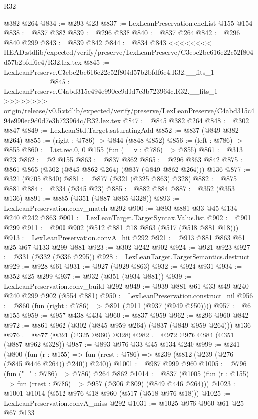 \begin{lexlean}{R32}
\begin{coremodule}
{{{{{{{{{{{{    @382
    @264
@834 := @293 @23
@837 := LexLeanPreservation.encList @155 @154
@838 := @837 @382
@839 := @296 @838
@840 := @837 @264
@842 := @296 @840 @299
@843 := @839 @842
@844 := @834 @843
<<<<<<<< HEAD:stdlib/expected/verify/preserve/LexLeanPreserve/C3ebc2be616e22c52f804d57b2bfdf6e4/R32.lex.tex
@845 := LexLeanPreserve.C3ebc2be616e22c52f804d57b2bfdf6e4.R32.__fits_1
========
@845 := LexLeanPreserve.C4abd315c494e990ec9d0d7e3b723964c.R32.__fits_1
>>>>>>>> origin/release/v0.5:stdlib/expected/verify/preserve/LexLeanPreserve/C4abd315c494e990ec9d0d7e3b723964c/R32.lex.tex
@847 := @845 @382 @264
@848 := @302 @847
@849 := LexLeanStd.Target.saturatingAdd
@852 := @837 (@849 @382 @264)
@855 := (right : @786) -> @844 (@848 @852)
@856 := (left : @786) -> @855
@860 := List.rec.{0, 0} @155 (fun (__v : @786) => @855)
@861 := @313 @23
@862 := @2 @155
@863 := @837 @862
@865 := @296 @863 @842
@875 := @861 @865 (@302 (@845 @862 @264) (@837 (@849 @862 @264))) @136
@877 := @321 (@705 @840)
@881 := @877 (@321 (@325 @863) @328)
@882 := @875 @881
@884 := @334 (@345 @23)
@885 := @882 @884
@887 := @352 (@353 @136)
@891 := @885 (@351 (@887 @865 @328))
@893 := LexLeanPreservation.conv_match @292
@900 := @893 @881 @33 @45 @134 @240 @242 @863
@901 := LexLeanTarget.TargetSyntax.Value.list
@902 := @901 @299
@911 := @900 @902 (@512 @881 @18 @863 (@517 (@518 @881 @18)))
@913 := LexLeanPreservation.convA_hit @292
@921 := @913 @881 @863 @61 @25 @67 @133 @299 @881
@923 := @302 @242 @902
@924 := @921 @923
@927 := @331 (@332 (@336 @295))
@928 := LexLeanTarget.TargetSemantics.destruct
@929 := @928 @61
@931 := @927 (@929 @863)
@932 := @924 @931
@934 := @352 @25 @299
@937 := @932 (@351 (@934 @881))
@939 := LexLeanPreservation.conv_build @292
@949 := @939 @881 @61 @33 @49 @240 @240 @299 @902 (@554 @881)
@950 := LexLeanPreservation.construct_nil
@956 := @860 (fun (right : @786) => @891 (@911 (@937 (@949 @950))))
@957 := @6 @155
@959 := @957 @438 @434
@960 := @837 @959
@962 := @296 @960 @842
@972 := @861 @962 (@302 (@845 @959 @264) (@837 (@849 @959 @264))) @136
@976 := @877 (@321 (@325 @960) @328)
@982 := @972 @976 @884 (@351 (@887 @962 @328))
@987 := @893 @976 @33 @45 @134 @240
@999 := @241
    (@800
      (fun (r : @155) =>
      fun (rrest : @786) => @239 (@812 (@239 (@276 (@845 @446 @264)) @240)) @240))
@1001 := @987 @999 @960
@1005 := @796 (fun ("_" : @786) => @786) @264 @862
@1014 := @837 (@1005 (fun (r : @155) => fun (rrest : @786) => @957 (@306 @809) (@849 @446 @264)))
@1023 := @1001 @1014 (@512 @976 @18 @960 (@517 (@518 @976 @18)))
@1025 := LexLeanPreservation.convA_miss @292
@1031 := @1025 @976 @960 @61 @25 @67 @133
}}}}}}}}}}}}
\end{coremodule}
\end{lexlean}
